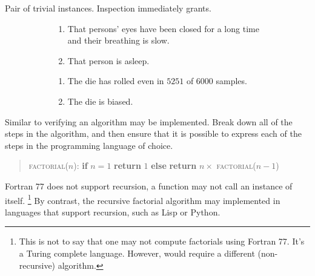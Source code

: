 \begin{note}
  Pair of trivial instances.
  Inspection immediately grants.
  \begin{illustration}
    \begin{figure}[h!]
    \mbox{}\hfill
    \begin{subfigure}{0.45\linewidth}
      \begin{enumerate}
      \item That persons' eyes have been closed for a long time and their breathing is slow.
      \item That person is asleep.
      \end{enumerate}
      \caption{}
    \end{subfigure}
    \hfill
    \begin{subfigure}{0.45\linewidth}
      \begin{enumerate}
      \item The die has rolled even in \(5251\) of \(6000\) samples.
      \item The die is biased.
      \end{enumerate}
      \caption{}
    \end{subfigure}
    \hfill\mbox{}
    \caption{}
    \label{fig:ideaS:basic-examples}
  \end{figure}
\end{illustration}
\end{note}

\begin{note}
  Similar to verifying an algorithm may be implemented.
  Break down all of the steps in the algorithm, and then ensure that it is possible to express each of the steps in the programming language of choice.

  \begin{quote}
    \textsc{factorial}(\(n\)):\newline
    \textbf{if} \(n = 1\)\newline
    \mbox{}\indent \textbf{return} \(1\)\newline
    \textbf{else}\newline
    \mbox{}\indent \textbf{return} \(n \times\) \textsc{factorial}(\(n-1\))
  \end{quote}

  Fortran 77 does not support recursion, a function may not call an instance of itself.\nolinebreak
  \footnote{
    This is not to say that one may not compute factorials using Fortran 77.
    It's a Turing complete language.
    However, would require a different (non-recursive) algorithm.
  }
  By contrast, the recursive factorial algorithm may implemented in languages that support recursion, such as Lisp or Python.
\end{note}

